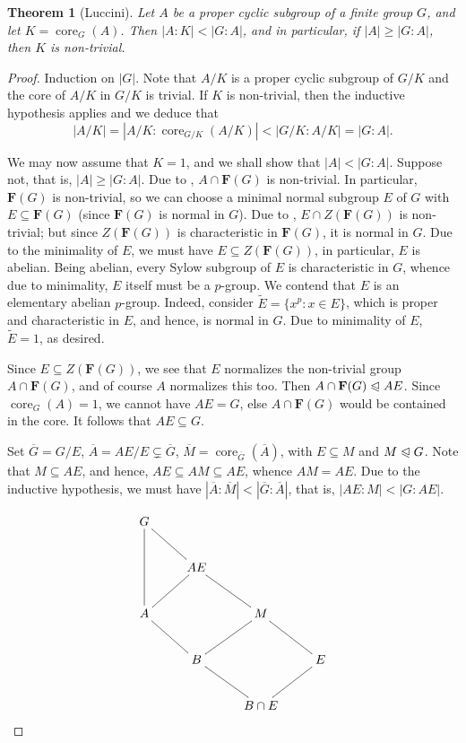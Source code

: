 \documentclass[12pt]{article}
\theoremstyle{thmstyle}
\newtheorem{theorem}{Theorem}[section]
\theoremstyle{defstyle}
\newcommand{\wt}[1]{\widetilde{#1}}
\renewcommand{\ge}{\geqslant}
\newcommand{\bfF}{\mathbf{F}} %
\newcommand{\noreq}{\trianglelefteqslant}
\newcommand{\core}{\operatorname{core}}
\begin{document}
\begin{theorem}[Luccini]
    Let $A$ be a proper cyclic subgroup of a finite group $G$, and let $K = \core_G(A)$. Then $|A : K| < |G : A|$, and in particular, if $|A|\ge |G : A|$, then $K$ is non-trivial.
\end{theorem}
\begin{proof}
    Induction on $|G|$. Note that $A/K$ is a proper cyclic subgroup of $G/K$ and the core of $A/K$ in $G/K$ is trivial. If $K$ is non-trivial, then the inductive hypothesis applies and we deduce that 
    \begin{equation*}
        |A/K| = \left|A/K : \core_{G/K}(A/K)\right| < |G/K : A/K| = |G : A|.
    \end{equation*}

    We may now assume  that $K = 1$, and we shall show that $|A| < |G : A|$. Suppose not, that is, $|A|\ge |G : A|$. Due to , $A\cap\bfF(G)$ is non-trivial. In particular, $\bfF(G)$ is non-trivial, so we can choose a minimal normal subgroup $E$ of $G$ with $E\subseteq\bfF(G)$ (since $\bfF(G)$ is normal in $G$). Due to , $E\cap Z(\bfF(G))$ is non-trivial; but since $Z(\bfF(G))$ is characteristic in $\bfF(G)$, it is normal in $G$. Due to the minimality of $E$, we must have $E\subseteq Z(\bfF(G))$, in particular, $E$ is abelian. Being abelian, every Sylow subgroup of $E$ is characteristic in $G$, whence due to minimality, $E$ itself must be a $p$-group. We contend that $E$ is an elementary abelian $p$-group. Indeed, consider $\wt E = \{x^p\colon x\in E\}$, which is proper and characteristic in $E$, and hence, is normal in $G$. Due to minimality of $E$, $\wt E = 1$, as desired.

    Since $E\subseteq Z(\bfF(G))$, we see that $E$ normalizes the non-trivial group $A\cap\bfF(G)$, and of course $A$ normalizes this too. Then $A\cap\bfF(G)\noreq AE$. Since $\core_G(A) = 1$, we cannot have $AE = G$, else $A\cap\bfF(G)$ would be contained in the core. It follows that $AE\subseteq G$.

    Set $\overline G = G/E$, $\overline A = AE/E\subsetneq\overline G$, $\overline{M} = \core_{\overline{G}}(\overline A)$, with $E\subseteq M$ and $M\noreq G$. Note that $M\subseteq AE$, and hence, $AE\subseteq AM\subseteq AE$, whence $AM = AE$. Due to the inductive hypothesis, we must have $|\overline A : \overline M| < |\overline G : \overline A|$, that is, $|AE : M| < |G : AE|$.

    \begin{equation*}
        \xymatrix {
            G\ar@{-}[dd]\ar@{-}[rd] & & & \\
            & AE\ar@{-}[rd]\ar@{-}[ld] & & \\
            A\ar@{-}[rd] & & M\ar@{-}[rd]\ar@{-}[ld] & \\
            & B\ar@{-}[rd] & & E\ar@{-}[ld] \\
            & & B\cap E & 
        }
    \end{equation*}


\end{proof}
\end{document}

